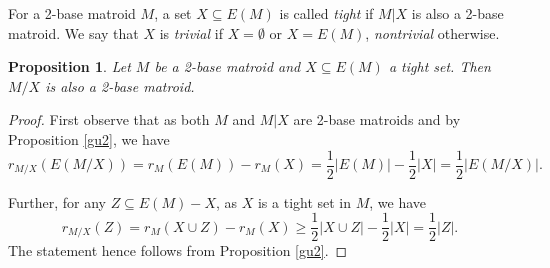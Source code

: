 \documentclass{article}
\newtheorem{Proposition}[Statement]{Proposition}
\begin{document}
For a 2-base matroid $M$, a set $X \subseteq E(M)$ is called {\it tight} if $M|X$ is also a 2-base matroid. We say that $X$ is {\it trivial} if  $X=\emptyset$ or $X= E(M)$, {\it nontrivial} otherwise.

\begin{Proposition}\label{kontrahierbaum}
Let $M$ be a 2-base matroid and $X \subseteq E(M)$ a tight set. Then $M/X$ is also a 2-base matroid.
\end{Proposition}
\begin{proof}
First observe that as both $M$ and $M|X$ are 2-base matroids and by Proposition \ref{gu2}, we have $$r_{M/X}(E(M/X))=r_M(E(M))-r_M(X)=\frac{1}{2}|E(M)|-\frac{1}{2}|X|=\frac{1}{2}|E(M/X)|.$$ 

Further, for any $Z \subseteq E(M)-X$, as $X$ is a tight set in $M$, we have $$r_{M/X}(Z)=r_M(X \cup Z)-r_M(X)\geq \frac{1}{2}|X\cup Z|-\frac{1}{2}|X|=\frac{1}{2}| Z|.$$ The statement hence follows from Proposition \ref{gu2}.%
\end{proof}
\end{document}

